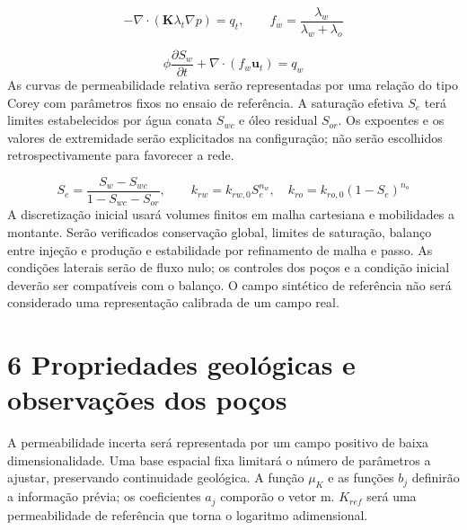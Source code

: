 \documentclass[12pt,a4paper]{article}
\begin{document}
\begin{equation}
-\nabla\cdot(\mathbf K\lambda_t\nabla p)=q_t,\qquad f_w=\frac{\lambda_w}{\lambda_w+\lambda_o}
\end{equation}

\begin{equation}
\phi\frac{\partial S_w}{\partial t}+\nabla\cdot(f_w\mathbf u_t)=q_w
\end{equation}
As curvas de permeabilidade relativa serão representadas por uma relação do tipo Corey com parâmetros fixos no ensaio de referência. A saturação efetiva \(S_{e}\) terá limites estabelecidos por água conata \(S_{wc}\) e óleo residual \(S_{or}\). Os expoentes e os valores de extremidade serão explicitados na configuração; não serão escolhidos retrospectivamente para favorecer a rede.\par

\begin{equation}
S_e=\frac{S_w-S_{wc}}{1-S_{wc}-S_{or}},\qquad k_{rw}=k_{rw,0}S_e^{n_w},\quad k_{ro}=k_{ro,0}(1-S_e)^{n_o}
\end{equation}
A discretização inicial usará volumes finitos em malha cartesiana e mobilidades a montante. Serão verificados conservação global, limites de saturação, balanço entre injeção e produção e estabilidade por refinamento de malha e passo. As condições laterais serão de fluxo nulo; os controles dos poços e a condição inicial deverão ser compatíveis com o balanço. O campo sintético de referência não será considerado uma representação calibrada de um campo real.\par

\newpage
\section*{6 Propriedades geológicas e observações dos poços}
A permeabilidade incerta será representada por um campo positivo de baixa dimensionalidade. Uma base espacial fixa limitará o número de parâmetros a ajustar, preservando continuidade geológica. A função \(\mu_{K}\) e as funções \(b_{j}\) definirão a informação prévia; os coeficientes \(a_{j}\) comporão o vetor m. \(K_{ref}\) será uma permeabilidade de referência que torna o logaritmo adimensional.\par
\end{document}
